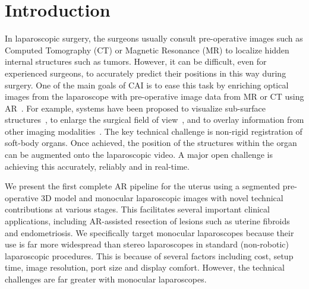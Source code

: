 
\section{Introduction}

In laparoscopic surgery, the surgeons usually consult pre-operative images such as Computed Tomography (CT) or Magnetic Resonance (MR) to localize hidden internal structures such as tumors. However, it can be difficult, even for experienced surgeons, to accurately predict their positions in this way during surgery. 
One of the main goals of CAI is to ease this task by enriching optical images from the laparoscope with pre-operative image data from MR or CT using AR~\cite{1732,8714}. 
For example, systems have been proposed to visualize sub-surface structures~\cite{Simpfendrfer2011}, to enlarge the surgical field of view~\cite{Totz2011}, and to overlay information from other imaging modalities~\cite{Nakamoto2008}.
The key technical challenge is non-rigid registration of soft-body organs. Once achieved, the position of the structures within the organ can be augmented onto the laparoscopic video. A major open challenge is achieving this accurately, reliably and in real-time. 

We present the first complete AR pipeline for the uterus using a segmented pre-operative 3D model and monocular laparoscopic images with novel technical contributions at various stages. This facilitates several important clinical applications, including AR-assisted resection of lesions such as uterine fibroids and endometriosis.  We specifically target monocular laparoscopes because their use is far more widespread than stereo laparoscopes in standard (non-robotic) laparoscopic procedures. This is because of several factors including
cost, setup time, image resolution, port size
and display comfort. However, the technical challenges are far greater with monocular laparoscopes. 

